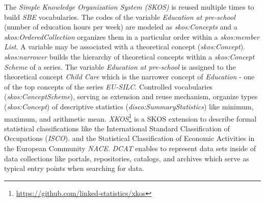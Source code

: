 \documentclass{llncs}
\begin{document}
The \emph{Simple Knowledge Organization System (SKOS)} is reused multiple times to build \emph{SBE} vocabularies.
The codes of the variable \emph{Education at pre-school} (number of education hours per week) are modeled as \emph{skos:Concepts} and 
a \emph{skos:OrderedCollection} organizes them in a particular order within a \emph{skos:member} \emph{List}.
A variable may be associated with a theoretical concept (\emph{skos:Concept}). 
\emph{skos:narrower} builds the hierarchy of theoretical concepts within a \emph{skos:Concept} \emph{Scheme} of a series.
The variable \emph{Education at pre-school} is assigned to the theoretical concept \emph{Child Care} which is the narrower concept of \emph{Education} - one of the top concepts of the series \emph{EU-SILC}.
Controlled vocabularies (\emph{skos:ConceptScheme}), serving as extension and reuse mechanism,
organize types (\emph{skos:Concept}) of descriptive statistics (\emph{disco:SummaryStatistics}) like minimum, maximum, and arithmetic mean.
\emph{XKOS}\footnote{\url{https://github.com/linked-statistics/xkos}} is a SKOS extension to describe formal statistical classifications like the International Standard Classification of Occupations (\emph{ISCO}). 
and the Statistical Classification of Economic Activities in the European Community \emph{NACE}.
\emph{DCAT} enables to represent data sets inside of data collections like portals, repositories, catalogs, and archives
which serve as typical entry points when searching for data.

\end{document}

